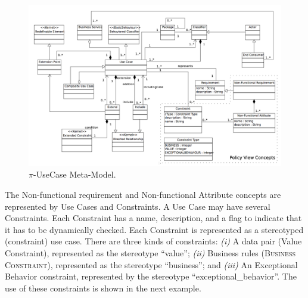 \documentclass{singlecol-new}
\theoremstyle{TH}{
\newtheorem{lemma}{Lemma}
\newtheorem{theorem}[lemma]{Theorem}
\newtheorem{corrolary}[lemma]{Corrolary}
\newtheorem{conjecture}[lemma]{Conjecture}
\newtheorem{proposition}[lemma]{Proposition}
\newtheorem{claim}[lemma]{Claim}
\newtheorem{stheorem}[lemma]{Wrong Theorem}
\newtheorem{algorithm}{Algorithm}
}
\theoremstyle{THrm}{
\newtheorem{definition}{Definition}[section]
\newtheorem{question}{Question}[section]
\newtheorem{remark}{Remark}
\newtheorem{scheme}{Scheme}
}
\theoremstyle{THhit}{
\newtheorem{case}{Case}[section]
}
\theoremstyle{THhsl}{
\newtheorem{example}{Example}
}
\begin{document}
 \begin{figure}[h]
\center
\includegraphics[width=1\textwidth]{./figures/UseCaseMetaModel.pdf}
\caption{\label{fig:CIM:usecasemetamodel} $\pi$-UseCase Meta-Model.}
\end{figure}


 The {\sc Non-functional requirement} and {\sc Non-functional Attribute} concepts are represented by {\sc Use Cases} and {\sc Constraints}.
A {\sc Use Case} may have several {\sc Constraints}. Each {\sc Constraint} has a name, description, and a flag to indicate that it has to be  dynamically checked.
Each {\sc Con\-straint} is represented as a stereotyped ({\sf constraint})\footnotemark {} use case.
There are three kinds of constraints:
\textit{(i)} A data pair ({\sc Value Constraint}), represented as the stereotype ``value'';
\textit{(ii)} Business rules (\textsc{Business Constraint}), represented as the stereotype {\sf ``business''}; and
\textit{(iii)} An {\sc Exceptional Behavior} constraint, represented by the stereotype {\sf ``exceptional\_behavior''}.
The use of these constraints is shown in the next example.
\end{document}
